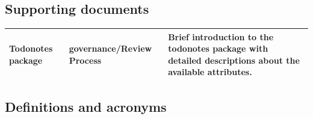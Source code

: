 \documentclass{template/openetcs_article}
\begin{document}
\subsection{Supporting documents}
\tablehead{}
\tabletail{}
\tablelasttail{}
\begin{supertabular}{|m{2cm}m{3cm}m{9cm}|}
\hline
Todonotes package &
governance/Review Process &
Brief introduction to the todonotes package with detailed descriptions about the available attributes. 
\\\hline
\end{supertabular}

\subsection{Definitions and acronyms}
\tablehead{}
\tabletail{}
\tablelasttail{}
\end{document}
